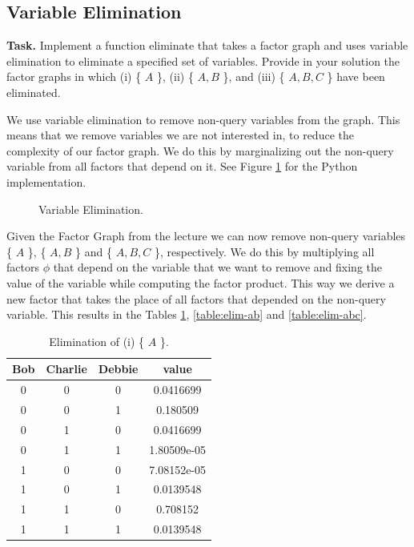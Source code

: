 \documentclass{support/acm_proc_article-sp}
\begin{document}
    \subsection{Variable Elimination}

    \textbf{Task.} Implement a function eliminate that takes a factor graph and uses variable elimination to eliminate
    a specified set of variables.
    Provide in your solution the factor graphs in which (i) \{ $A$ \}, (ii) \{ $A, B$ \},
    and (iii) \{ $A, B, C$ \} have been eliminated.

    We use variable elimination to remove non-query variables from the graph.
    This means that we remove variables we are not interested in, to reduce the complexity of our factor graph.
    We do this by marginalizing out the non-query variable from all factors that depend on it.
    See Figure \ref{fig:eliminate} for the Python implementation.
    \begin{figure}[!htbp]
        \centering
        \lstset{numbers=none,xleftmargin=0em}
        
        \caption{Variable Elimination.}
        \label{fig:eliminate}
    \end{figure}

    Given the Factor Graph from the lecture we can now remove non-query variables \{ $A$ \}, \{ $A, B$ \} and \{ $A, B, C$ \},
    respectively.
    We do this by multiplying all factors $\phi$ that depend on the variable that we want to remove and fixing the value
    of the variable while computing the factor product.
    This way we derive a new factor that takes the place of all factors that depended on the non-query variable.
    This results in the Tables \ref{table:elim-a}, \ref{table:elim-ab} and \ref{table:elim-abc}.
    \begin{table}[!htbp]
        \begin{center}
            \begin{tabular}{ c c c | c }
                Bob & Charlie & Debbie & value \\
                \hline
                0 & 0 & 0 & 0.0416699 \\
                0 & 0 & 1 & 0.180509 \\
                0 & 1 & 0 & 0.0416699 \\
                0 & 1 & 1 & 1.80509e-05 \\
                1 & 0 & 0 & 7.08152e-05 \\
                1 & 0 & 1 & 0.0139548 \\
                1 & 1 & 0 & 0.708152 \\
                1 & 1 & 1 & 0.0139548 \\
            \end{tabular}
        \end{center}
        \caption{Elimination of (i) \{ $A$ \}.}
        \label{table:elim-a}
    \end{table}
\end{document}
